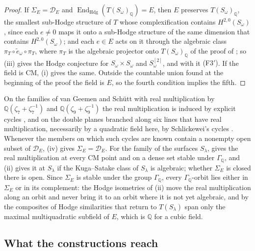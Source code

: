 \documentclass[11pt,reqno]{amsart}
\theoremstyle{plain}
\theoremstyle{definition}
\theoremstyle{remark}
\newcommand{\QQ}{\mathbb{Q}}
\newcommand{\cD}{\mathcal{D}}
\DeclareMathOperator{\End}{End}
\begin{document}
\begin{proof}
If $\Sigma_{E}=\cD_{E}$ and $\End_{\mathrm{Hdg}}(T(S_{\omega})_{\QQ})=E$, then
$E$ preserves $T(S_{\omega})_{\QQ}$, the smallest sub-Hodge structure of $T$
whose complexification contains $H^{2,0}(S_{\omega})$, since each $e\ne0$
maps it onto a sub-Hodge structure of the same dimension that contains
$H^{2,0}(S_{\omega})$; and each $e\in E$ acts
on it through the algebraic class $\pi_{T}\circ\tilde e_{\omega}\circ\pi_{T}$,
where $\pi_{T}$ is the algebraic projector onto $T(S_{\omega})_{\QQ}$ of the
proof of ; so (iii) gives the Hodge
conjecture for $S_{\omega}\times S_{\omega}$ and $S_{\omega}^{[2]}$, and with
it \textup{(F3$'$)}. If the field is CM, (i) gives the
same. Outside the countable union found at the beginning of the proof the
field is $E$, so the fourth condition implies the fifth.
\end{proof}

On the families of van Geemen and Sch\"utt with real multiplication by
$\QQ(\zeta_{7}+\zeta_{7}^{-1})$ and $\QQ(\zeta_{9}+\zeta_{9}^{-1})$ the
real multiplication is induced by explicit cycles \cite[Theorem~1.2 and
Section~4.8]{vGS25}, and on the double planes branched along six lines that
have real multiplication, necessarily by a quadratic field here, by
Schlickewei's cycles \cite{Sch10,vG08}. Whenever the members on which such
cycles are known contain a nonempty open subset of $\cD_{E}$, (iv) gives
$\Sigma_{E}=\cD_{E}$. For the family of the surfaces $S_{\lambda}$,
 gives the real multiplication at every CM point and on a
dense set stable under $\Gamma_{\QQ}$, and (ii) gives it
at $S_{\lambda}$ if the Kuga--Satake class of $S_{\lambda}$ is algebraic;
whether $\Sigma_{E}$ is closed there is open. Since $\Sigma_{E}$ is stable
under the group $\Gamma_{\QQ}$, every $\Gamma_{\QQ}$-orbit lies either in
$\Sigma_{E}$ or in its complement: the Hodge isometries of (ii) move the real
multiplication along an orbit and never bring it to an orbit where it is not
yet algebraic, and by  the composites of Hodge
similarities that return to $T(S_{\lambda})$ span only the maximal
multiquadratic subfield of $E$, which is $\QQ$ for a cubic field.

\subsection{What the constructions reach}\label{ssec:reach}
\end{document}
